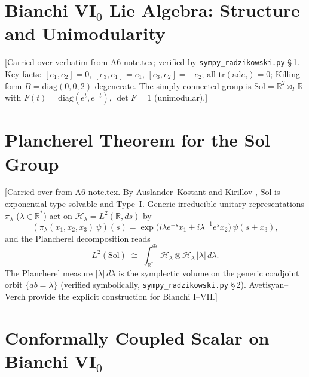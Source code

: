 \documentclass[11pt,a4paper]{article}
\theoremstyle{definition}
\newcommand{\Sol}{\mathrm{Sol}}
\newcommand{\R}{\mathbb{R}}
\newcommand{\Lp}{L^2}
\newcommand{\ad}{\mathrm{ad}}
\newcommand{\tr}{\mathrm{tr}}
\newcommand{\cH}{\mathcal{H}}
\begin{document}
\section{Bianchi VI$_0$ Lie Algebra: Structure and Unimodularity}
\label{sec:lie}

[Carried over verbatim from A6 note.tex; verified by
\texttt{sympy\_radzikowski.py} \S\,1.  Key facts:
$[e_1,e_2]=0$, $[e_3,e_1]=e_1$, $[e_3,e_2]=-e_2$;
all $\tr(\ad e_i)=0$; Killing form $B=\mathrm{diag}(0,0,2)$ degenerate.
The simply-connected group is $\Sol = \R^2\rtimes_F \R$ with
$F(t)=\mathrm{diag}(e^t,e^{-t})$, $\det F = 1$ (unimodular).]

\section{Plancherel Theorem for the Sol Group}
\label{sec:plancherel}

[Carried over from A6 note.tex.  By Auslander--Kostant \cite{AK71} and
Kirillov \cite{Kir04}, $\Sol$ is exponential-type solvable and Type~I.
Generic irreducible unitary representations $\pi_\lambda$ ($\lambda\in\R^*$)
act on $\cH_\lambda = \Lp(\R, ds)$ by
\begin{equation}\label{eq:rep}
  (\pi_\lambda(x_1,x_2,x_3)\,\psi)(s)
  = \exp\bigl(i\lambda e^{-s}x_1 + i\lambda^{-1} e^{s} x_2\bigr)\,\psi(s+x_3),
\end{equation}
and the Plancherel decomposition reads
\begin{equation}\label{eq:plancherel}
  \Lp(\Sol)\;\cong\;\int_{\R^*}^{\oplus} \cH_\lambda\otimes\cH_\lambda\,
  |\lambda|\,d\lambda.
\end{equation}
The Plancherel measure $|\lambda|\,d\lambda$ is the symplectic volume on the
generic coadjoint orbit $\{ab=\lambda\}$ (verified symbolically,
\texttt{sympy\_radzikowski.py} \S\,2).  Avetisyan--Verch \cite{AV13} provide the
explicit construction for Bianchi I--VII.]

\section{Conformally Coupled Scalar on Bianchi VI$_0$}
\label{sec:metric}
\end{document}
